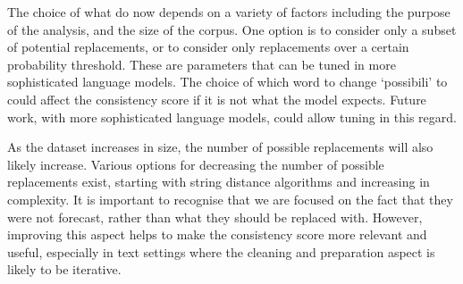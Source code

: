 \documentclass[11pt,]{article}
\newenvironment{Shaded}{\begin{snugshade}}{\end{snugshade}}
\newcommand{\CommentTok}[1]{\textcolor[rgb]{0.56,0.35,0.01}{\textit{#1}}}
\newcommand{\KeywordTok}[1]{\textcolor[rgb]{0.13,0.29,0.53}{\textbf{#1}}}
\newcommand{\NormalTok}[1]{#1}
\newcommand{\OperatorTok}[1]{\textcolor[rgb]{0.81,0.36,0.00}{\textbf{#1}}}
\newcommand{\StringTok}[1]{\textcolor[rgb]{0.31,0.60,0.02}{#1}}
\begin{document}
\begin{Shaded}
\end{Shaded}

The choice of what do now depends on a variety of factors including the purpose of the analysis, and the size of the corpus. One option is to consider only a subset of potential replacements, or to consider only replacements over a certain probability threshold. These are parameters that can be tuned in more sophisticated language models. The choice of which word to change `possibili' to could affect the consistency score if it is not what the model expects. Future work, with more sophisticated language models, could allow tuning in this regard.

As the dataset increases in size, the number of possible replacements will also likely increase. Various options for decreasing the number of possible replacements exist, starting with string distance algorithms and increasing in complexity. It is important to recognise that we are focused on the fact that they were not forecast, rather than what they should be replaced with. However, improving this aspect helps to make the consistency score more relevant and useful, especially in text settings where the cleaning and preparation aspect is likely to be iterative.
\end{document}
